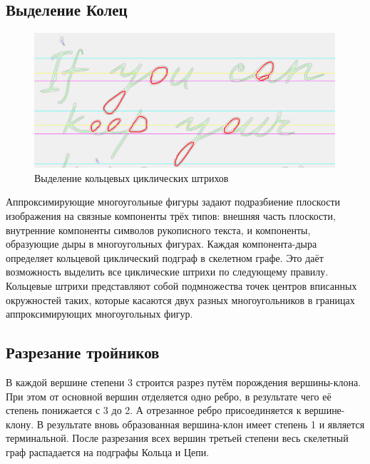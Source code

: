 \documentclass{article}
\begin{document}


\subsection{Выделение Колец}

    \begin{figure}[H]
    	\includegraphics[scale=0.9, height = 5cm]{img/mest6.png}
    	\centering
    	\caption{Выделение кольцевых циклических штрихов}
    	\label{pic:16}
    \end{figure}


    Аппроксимирующие многоугольные фигуры задают подразбиение плоскости изображения на связные компоненты трёх типов: внешняя часть плоскости, внутренние компоненты символов рукописного текста, и компоненты, образующие дыры в многоугольных фигурах. Каждая компонента-дыра определяет кольцевой циклический подграф в скелетном графе. Это даёт возможность выделить все циклические штрихи по следующему правилу. Кольцевые штрихи представляют собой подмножества точек центров вписанных окружностей таких, которые касаются двух разных многоугольников в границах аппроксимирующих многоугольных фигур. 

\subsection{Разрезание тройников}

    В каждой вершине степени 3 строится разрез путём порождения вершины-клона. При этом от основной вершин отделяется одно ребро, в результате чего её степень понижается с 3 до 2. А отрезанное ребро присоединяется к вершине-клону. В результате вновь образованная вершина-клон имеет степень 1 и является терминальной. После разрезания всех вершин третьей степени весь скелетный граф распадается на подграфы Кольца и Цепи.
     
\end{document}
